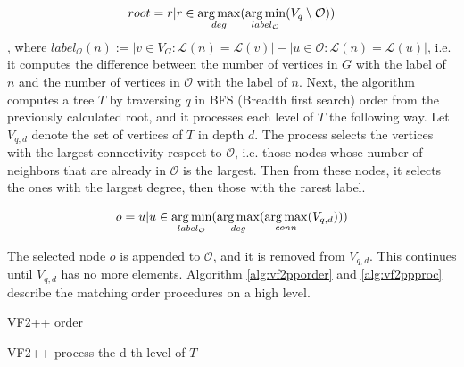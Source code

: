 \[ root = {r | r \in \operatorname*{arg\,max}_{deg}(\operatorname*{arg\,min}_{label_{\mathcal{O}}}(V_q \setminus \mathcal{O}))} \]
, where $label_{\mathcal{O}}(n) := |{v \in V_G : \mathcal{L}(n) = \mathcal{L}(v)}| - |{u \in \mathcal{O}: \mathcal{L}(n) = \mathcal{L}(u)}|$, 
i.e. it computes the difference between the number of vertices in $G$ with the label of $n$ and 
the number of vertices in $\mathcal{O}$ with the label of $n$. Next, the algorithm computes a tree 
$T$ by traversing $q$ in BFS (Breadth first search) order from the previously calculated root, and
it processes each level of $T$ the following way. Let $V_{q,d}$ denote the set of vertices of $T$ in
depth $d$. The process selects the vertices with the largest connectivity respect to $\mathcal{O}$,
i.e. those nodes whose number of neighbors that are already in $\mathcal{O}$ is the largest. Then
from these nodes, it selects the ones with the largest degree, then those with the rarest label.

\[ o = {u | u \in \operatorname*{arg\,min}_{label_{\mathcal{O}}}(\operatorname*{arg\,max}_{deg}(\operatorname*{arg\,max}_{conn}(V_{q,d})))} \]

The selected node $o$ is appended to $\mathcal{O}$, and it is removed from $V_{q,d}$. This continues 
until $V_{q,d}$ has no more elements. Algorithm \ref{alg:vf2pporder} and \ref{alg:vf2ppproc} describe
the matching order procedures on a high level.

\begin{algorithm}[h]
    \SetAlgoLined\DontPrintSemicolon
    \label{alg:vf2pporder}
    \caption{VF2++ order}
\end{algorithm}

\begin{algorithm}[h]
    \SetAlgoLined\DontPrintSemicolon
    \label{alg:vf2ppproc}
    \caption{VF2++ process the d-th level of $T$}
\end{algorithm}

